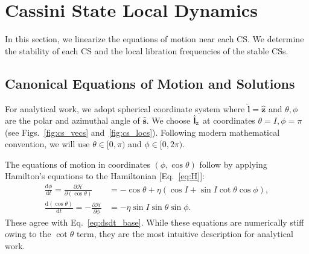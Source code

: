 \documentclass[
        fleqn,
        usenatbib,
    ]{mnras}
\newcommand*{\rd}[2]{\frac{\mathrm{d}#1}{\mathrm{d}#2}}
\newcommand*{\pd}[2]{\frac{\partial#1}{\partial#2}}
\newcommand*{\bm}[1]{\boldsymbol{\mathbf{#1}}}
\newcommand*{\uv}[1]{\hat{\bm{#1}}}
\newcommand*{\p}[1]{\left(#1\right)}
\begin{document}
\section{Cassini State Local Dynamics}\label{s:local_dynamics}

In this section, we linearize the equations of motion near each CS\@. We
determine the stability of each CS and the local libration frequencies of the
stable CSs.

\subsection{Canonical Equations of Motion and Solutions}

For analytical work, we adopt spherical coordinate system where $\uv{l} =
\uv{z}$ and $\theta, \phi$ are the polar and azimuthal angle of $\uv{s}$. We
choose $\uv{l}_{\rm z}$ at coordinates $\theta = I, \phi = \pi$ (see
Figs.~\ref{fig:cs_vecs} and~\ref{fig:cs_locs}). Following modern mathematical
convention, we will use
$\theta \in [0, \pi)$%
and $\phi \in [0, 2\pi)$.%

The equations of motion in coordinates $\p{\phi, \cos \theta}$ follow by
applying Hamilton's equations to the Hamiltonian [Eq.~\eqref{eq:H}]:
\begin{subequations}\label{se:H_eom}
    \begin{align}
        \rd{\phi}{t} = \pd{\mathcal{H}}{(\cos\theta)}
            &= -\cos\theta + \eta\p{\cos I + \sin I \cot \theta \cos \phi},
                \label{seq:H_eom_phi_t}\\
        \rd{(\cos \theta)}{t} = -\pd{\mathcal{H}}{\phi}
            &= -\eta \sin I \sin \theta \sin \phi.
                \label{seq:H_eom_mu_t}
    \end{align}
\end{subequations}
These agree with Eq.~\eqref{eq:dsdt_base}. While these equations are numerically
stiff owing to the $\cot\theta$ term, they are the most intuitive description
for analytical work.
\end{document}
